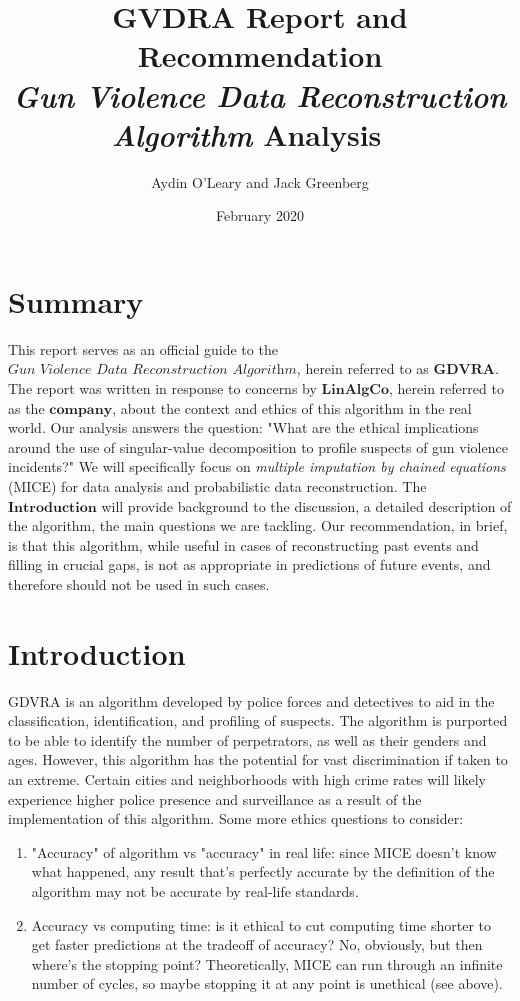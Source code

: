 \documentclass{article}
\title{GVDRA Report and Recommendation\\
\large{\textit{Gun Violence Data Reconstruction Algorithm} Analysis} \
}
\author{Aydin O'Leary and Jack Greenberg}
\date{February 2020}
\newcommand{\be}{\begin{enumerate}}
\newcommand{\ee}{\end{enumerate}}
\begin{document}
\maketitle
\section*{Summary}
This report serves as an official guide to the $\textit{Gun Violence Data Reconstruction Algorithm}$, herein referred to as $\textbf{GDVRA}$. The report was written in response to concerns by $\textbf{LinAlgCo}$, herein referred to as the $\textbf{company}$, about the context and ethics of this algorithm in the real world. Our analysis answers the question: "What are the ethical implications around the use of singular-value decomposition to profile suspects of gun violence incidents?" We will specifically focus on \textit{multiple imputation by chained equations} (\textsc{MICE}) for data analysis and probabilistic data reconstruction. The $\textbf{Introduction}$ will provide background to the discussion, a detailed description of the algorithm, the main questions we are tackling. Our recommendation, in brief, is that this algorithm, while useful in cases of reconstructing past events and filling in crucial gaps, is not as appropriate in predictions of future events, and therefore should not be used in such cases.

\section*{Introduction}
GDVRA is an algorithm developed by police forces and detectives to aid in the classification, identification, and profiling of suspects. The algorithm is purported to be able to identify the number of perpetrators, as well as their genders and ages. However, this algorithm has the potential for vast discrimination if taken to an extreme. Certain cities and neighborhoods with high crime rates will likely experience higher police presence and surveillance as a result of the implementation of this algorithm. Some more ethics questions to consider:\\
\be
    \item "Accuracy" of algorithm vs "accuracy" in real life: since MICE doesn't know what happened, any result that's perfectly accurate by the definition of the algorithm may not be accurate by real-life standards.
    \item Accuracy vs computing time: is it ethical to cut computing time shorter to get faster predictions at the tradeoff of accuracy? No, obviously, but then where's the stopping point? Theoretically, MICE can run through an infinite number of cycles, so maybe stopping it at any point is unethical (see above).
\ee
\end{document}

